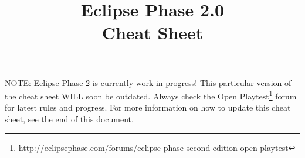 \documentclass{article}
\title{Eclipse Phase 2.0\\\small{Cheat Sheet}}
\begin{document}
\maketitle


\begin{warning}
NOTE: Eclipse Phase 2 is currently work in progress! This particular version of the
cheat sheet WILL soon be outdated. Always check the Open Playtest\footnote{\url{http://eclipsephase.com/forums/eclipse-phase-second-edition-open-playtest}}
forum for latest rules and progress. For more information on
how to update this cheat sheet, see the end of this document.
\end{warning}





 






\end{document}
